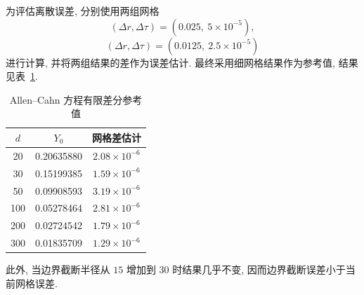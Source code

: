     为评估离散误差, 分别使用两组网格
    \begin{equation*}
      (\Delta r,\Delta \tau)=(0.025,\ 5\times 10^{-5}),
    \end{equation*}
    \begin{equation*}
      (\Delta r,\Delta \tau)=(0.0125,\ 2.5\times 10^{-5})
    \end{equation*}
    进行计算, 并将两组结果的差作为误差估计.
    最终采用细网格结果作为参考值, 结果见表~\ref{tab:ref_allencahn}.

    \begin{table}
      \centering
      \caption{Allen--Cahn 方程有限差分参考值}
      \label{tab:ref_allencahn}
      \begin{tabular}{ccc}
        \toprule
        $d$ & $Y_0$ & 网格差估计 \\
        \midrule
        20 & 0.20635880 & $2.08\times 10^{-6}$ \\
        30 & 0.15199385 & $1.59\times 10^{-6}$ \\
        50 & 0.09908593 & $3.19\times 10^{-6}$ \\
        100 & 0.05278464 & $2.81\times 10^{-6}$ \\
        200 & 0.02724542 & $1.79\times 10^{-6}$ \\
        300 & 0.01835709 & $1.29\times 10^{-6}$ \\
        \bottomrule
      \end{tabular}
    \end{table}

    此外, 当边界截断半径从 $15$ 增加到 $30$ 时结果几乎不变,
    因而边界截断误差小于当前网格误差.
